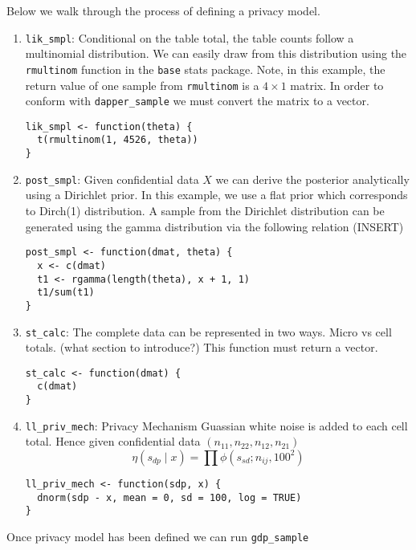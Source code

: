 Below we walk through the process of defining a privacy model.

\begin{enumerate}
\def\labelenumi{\arabic{enumi}.}
\item
  \texttt{lik\_smpl}: Conditional on the table total, the table counts follow a multinomial
  distribution. We can easily draw from this distribution using the
  \texttt{rmultinom} function in the \texttt{base} stats package. Note, in this example,
  the return value of one sample from \texttt{rmultinom} is a \(4 \times 1\) matrix. In order to
  conform with \texttt{dapper\_sample} we must convert the matrix to a vector.

\begin{verbatim}
lik_smpl <- function(theta) {
  t(rmultinom(1, 4526, theta))
}
\end{verbatim}
\item
  \texttt{post\_smpl}: Given confidential data \(X\) we can derive the posterior analytically
  using a Dirichlet prior. In this example, we use a flat prior which
  corresponds to Dirch(1) distribution. A sample from the Dirichlet distribution
  can be generated using the gamma distribution via the following relation (INSERT)

\begin{verbatim}
post_smpl <- function(dmat, theta) {
  x <- c(dmat)
  t1 <- rgamma(length(theta), x + 1, 1)
  t1/sum(t1)
}
\end{verbatim}
\item
  \texttt{st\_calc}: The complete data can be represented in two ways. Micro vs cell totals.
  (what section to introduce?) This function must return a vector.

\begin{verbatim}
st_calc <- function(dmat) {
  c(dmat)
}
\end{verbatim}
\item
  \texttt{ll\_priv\_mech}: Privacy Mechanism
  Guassian white noise is added to each cell total. Hence given
  confidential data \((n_{11}, n_{22}, n_{12}, n_{21})\)
  \[
  \eta(s_{dp} \mid x) = \prod \phi(s_{sd}; n_{ij}, 100^2)
  \]

\begin{verbatim}
ll_priv_mech <- function(sdp, x) {
  dnorm(sdp - x, mean = 0, sd = 100, log = TRUE)
}
\end{verbatim}
\end{enumerate}

Once privacy model has been defined we can run \texttt{gdp\_sample}

